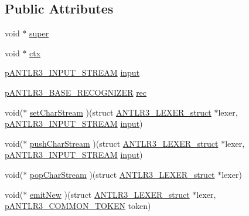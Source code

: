 \subsection*{Public Attributes}
\begin{DoxyCompactItemize}
\item 
void $\ast$ \hyperlink{struct_a_n_t_l_r3___l_e_x_e_r__struct_ae500bd5337a874e4c753b614fafc1eec}{super}
\item 
void $\ast$ \hyperlink{struct_a_n_t_l_r3___l_e_x_e_r__struct_aa8c9ab64d60b659c71263c2f2a39779a}{ctx}
\item 
\hyperlink{antlr3interfaces_8h_a30a8f71f3e04066360723d538fd67f16}{p\-A\-N\-T\-L\-R3\-\_\-\-I\-N\-P\-U\-T\-\_\-\-S\-T\-R\-E\-A\-M} \hyperlink{struct_a_n_t_l_r3___l_e_x_e_r__struct_a63668c0391badeb589243179e93f1a0a}{input}
\item 
\hyperlink{group___a_n_t_l_r3___b_a_s_e___r_e_c_o_g_n_i_z_e_r_ga5aeeb8dcbf65f45605ae07cbd618e24c}{p\-A\-N\-T\-L\-R3\-\_\-\-B\-A\-S\-E\-\_\-\-R\-E\-C\-O\-G\-N\-I\-Z\-E\-R} \hyperlink{struct_a_n_t_l_r3___l_e_x_e_r__struct_afcb0d60a4a2c829c30cc1e8e3454390f}{rec}
\item 
void($\ast$ \hyperlink{struct_a_n_t_l_r3___l_e_x_e_r__struct_a5c28d84198fa94f172e35887f52c248f}{set\-Char\-Stream} )(struct \hyperlink{struct_a_n_t_l_r3___l_e_x_e_r__struct}{A\-N\-T\-L\-R3\-\_\-\-L\-E\-X\-E\-R\-\_\-struct} $\ast$lexer, \hyperlink{antlr3interfaces_8h_a30a8f71f3e04066360723d538fd67f16}{p\-A\-N\-T\-L\-R3\-\_\-\-I\-N\-P\-U\-T\-\_\-\-S\-T\-R\-E\-A\-M} \hyperlink{struct_a_n_t_l_r3___l_e_x_e_r__struct_a63668c0391badeb589243179e93f1a0a}{input})
\item 
void($\ast$ \hyperlink{struct_a_n_t_l_r3___l_e_x_e_r__struct_afa7cff0e582050f15c7c27e17a2e844c}{push\-Char\-Stream} )(struct \hyperlink{struct_a_n_t_l_r3___l_e_x_e_r__struct}{A\-N\-T\-L\-R3\-\_\-\-L\-E\-X\-E\-R\-\_\-struct} $\ast$lexer, \hyperlink{antlr3interfaces_8h_a30a8f71f3e04066360723d538fd67f16}{p\-A\-N\-T\-L\-R3\-\_\-\-I\-N\-P\-U\-T\-\_\-\-S\-T\-R\-E\-A\-M} \hyperlink{struct_a_n_t_l_r3___l_e_x_e_r__struct_a63668c0391badeb589243179e93f1a0a}{input})
\item 
void($\ast$ \hyperlink{struct_a_n_t_l_r3___l_e_x_e_r__struct_af3f03678a1511675104bc37ada7dcade}{pop\-Char\-Stream} )(struct \hyperlink{struct_a_n_t_l_r3___l_e_x_e_r__struct}{A\-N\-T\-L\-R3\-\_\-\-L\-E\-X\-E\-R\-\_\-struct} $\ast$lexer)
\item 
void($\ast$ \hyperlink{struct_a_n_t_l_r3___l_e_x_e_r__struct_a59104ea186b3ad9ce763dc1feee71bd4}{emit\-New} )(struct \hyperlink{struct_a_n_t_l_r3___l_e_x_e_r__struct}{A\-N\-T\-L\-R3\-\_\-\-L\-E\-X\-E\-R\-\_\-struct} $\ast$lexer, \hyperlink{antlr3interfaces_8h_adaa6df9cbf0cd7ab37fd545520ff299b}{p\-A\-N\-T\-L\-R3\-\_\-\-C\-O\-M\-M\-O\-N\-\_\-\-T\-O\-K\-E\-N} token)

\end{DoxyCompactItemize}
